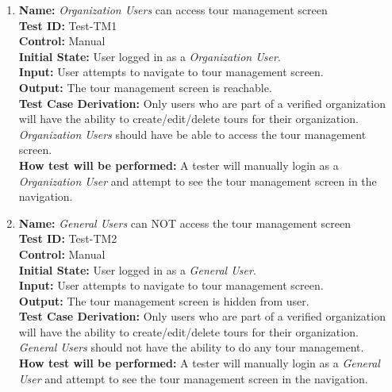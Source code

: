 \documentclass[12pt, titlepage]{article}
\begin{document}
\begin{enumerate}

  \item
        \textbf{Name:} \textit{Organization Users} can access tour management screen \label{itm:Test-TM1} \\
        \textbf{Test ID:} Test-TM1 \\
        \textbf{Control:} Manual \\
        \textbf{Initial State:} User logged in as a \textit{Organization User}. \\
        \textbf{Input:} User attempts to navigate to tour management screen. \\
        \textbf{Output:} The tour management screen is reachable. \\
        \textbf{Test Case Derivation:} Only users who are part of a verified organization will have the ability to create/edit/delete tours for their organization. \textit{Organization Users} should have be able to access the tour management screen. \\
        \textbf{How test will be performed:} A tester will manually login as a \textit{Organization User} and attempt to see the tour management screen in the navigation.

  \item
        \textbf{Name:} \textit{General Users} can NOT access the tour management screen \label{itm:Test-TM2} \\
        \textbf{Test ID:} Test-TM2 \\
        \textbf{Control:} Manual \\
        \textbf{Initial State:} User logged in as a \textit{General User}. \\
        \textbf{Input:} User attempts to navigate to tour management screen. \\
        \textbf{Output:} The tour management screen is hidden from user. \\
        \textbf{Test Case Derivation:} Only users who are part of a verified organization will have the ability to create/edit/delete tours for their organization. \textit{General Users} should not have the ability to do any tour management. \\
        \textbf{How test will be performed:} A tester will manually login as a \textit{General User} and attempt to see the tour management screen in the navigation.


\end{enumerate}
\end{document}
